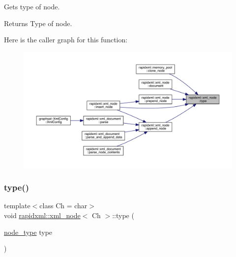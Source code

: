 Gets type of node. \begin{DoxyReturn}{Returns}
Type of node. 
\end{DoxyReturn}
Here is the caller graph for this function\+:\nopagebreak
\begin{figure}[H]
\begin{center}
\leavevmode
\includegraphics[width=350pt]{classrapidxml_1_1xml__node_a5f91729128856b0aaab598d4364ace60_icgraph}
\end{center}
\end{figure}
\mbox{\label{classrapidxml_1_1xml__node_a499bbc9300c1b06821d5c08b24164c68}} 
\subsubsection{\texorpdfstring{type()}{type()}\hspace{0.1cm}{\footnotesize\ttfamily [2/2]}}
{\footnotesize\ttfamily template$<$class Ch = char$>$ \\
void \mbox{\hyperlink{classrapidxml_1_1xml__node}{rapidxml\+::xml\+\_\+node}}$<$ Ch $>$\+::type (\begin{DoxyParamCaption}\item[{\mbox{\hyperlink{namespacerapidxml_abb456db38f7efb746c4330eed6072a7c}{node\+\_\+type}}}]{type }\end{DoxyParamCaption})\hspace{0.3cm}{\ttfamily [inline]}}

